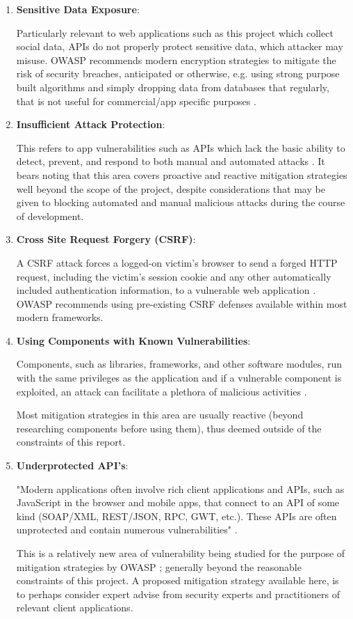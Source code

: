 \begin{enumerate}
    \item \textbf{Sensitive Data Exposure}:
    
    Particularly relevant to web applications such as this project which collect social data, APIs do not properly protect sensitive data, which attacker may misuse. OWASP recommends modern encryption strategies to mitigate the risk of security breaches, anticipated or otherwise, e.g. using strong purpose built algorithms and simply dropping data from databases that regularly, that is not useful for commercial/app specific purposes \cite{OWASP2017}.
    
    \item \textbf{Insufficient Attack Protection}:
    
    This refers to app vulnerabilities such as APIs which lack the basic ability to detect, prevent, and respond to both manual and automated attacks \cite{OWASP2017}. It bears noting that this area covers proactive and reactive mitigation strategies well beyond the scope of the project, despite considerations that may be given to blocking automated and manual malicious attacks during the course of development.
    
    \item \textbf{Cross Site Request Forgery (CSRF)}:
    
    A CSRF attack forces a logged-on victim's browser to send a forged HTTP request, including the victim’s session cookie and any other automatically included authentication information, to a vulnerable web application \cite{OWASP2017}. OWASP recommends using pre-existing CSRF defenses available within most modern frameworks.
    
    \item \textbf{Using Components with Known Vulnerabilities}:
    
    Components, such as libraries, frameworks, and other software modules, run with the same privileges as the application and if a vulnerable component is exploited,  an attack can facilitate  a plethora of malicious activities \cite{OWASP2017}.
    
    Most mitigation strategies in this area are usually reactive (beyond researching components before using them), thus deemed outside of the constraints of this report.
    
    \item \textbf{Underprotected API's}:
    
    "Modern applications often involve rich client applications and APIs, such as JavaScript in the browser and mobile apps, that connect to an API of some kind (SOAP/XML, REST/JSON, RPC, GWT, etc.). These APIs are often unprotected and contain numerous vulnerabilities" \cite{OWASP2017}.
    
    This is a relatively new area of vulnerability being studied for the purpose of mitigation strategies by OWASP \cite{OWASP2017}; generally beyond the reasonable constraints of this project. A proposed mitigation strategy available here, is to perhaps consider expert advise from security experts and practitioners of relevant client applications.
    
\end{enumerate}
